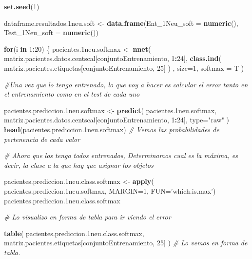 \documentclass[]{article}
\newenvironment{Shaded}{\begin{snugshade}}{\end{snugshade}}
\newcommand{\KeywordTok}[1]{\textcolor[rgb]{0.13,0.29,0.53}{\textbf{#1}}}
\newcommand{\DataTypeTok}[1]{\textcolor[rgb]{0.13,0.29,0.53}{#1}}
\newcommand{\DecValTok}[1]{\textcolor[rgb]{0.00,0.00,0.81}{#1}}
\newcommand{\StringTok}[1]{\textcolor[rgb]{0.31,0.60,0.02}{#1}}
\newcommand{\CommentTok}[1]{\textcolor[rgb]{0.56,0.35,0.01}{\textit{#1}}}
\newcommand{\ControlFlowTok}[1]{\textcolor[rgb]{0.13,0.29,0.53}{\textbf{#1}}}
\newcommand{\OperatorTok}[1]{\textcolor[rgb]{0.81,0.36,0.00}{\textbf{#1}}}
\newcommand{\NormalTok}[1]{#1}
\begin{document}
\begin{Shaded}
\begin{Highlighting}[]
\KeywordTok{set.seed}\NormalTok{(}\DecValTok{1}\NormalTok{)}

\NormalTok{dataframe.resultados.1neu.soft <-}\StringTok{ }\KeywordTok{data.frame}\NormalTok{(}\DataTypeTok{Ent_1Neu_soft =} \KeywordTok{numeric}\NormalTok{(),}
                                             \DataTypeTok{Test_1Neu_soft =} \KeywordTok{numeric}\NormalTok{())}

\ControlFlowTok{for}\NormalTok{(i }\ControlFlowTok{in} \DecValTok{1}\OperatorTok{:}\DecValTok{20}\NormalTok{)}
\NormalTok{\{}
\NormalTok{  pacientes.1neu.softmax <-}\StringTok{ }\KeywordTok{nnet}\NormalTok{( matriz.pacientes.datos.centscal[conjuntoEntrenamiento, }\DecValTok{1}\OperatorTok{:}\DecValTok{24}\NormalTok{], }\KeywordTok{class.ind}\NormalTok{( matriz.pacientes.etiquetas[conjuntoEntrenamiento, }\DecValTok{25}\NormalTok{] ) , }\DataTypeTok{size=}\DecValTok{1}\NormalTok{, }\DataTypeTok{softmax =}\NormalTok{ T )}

  \CommentTok{#Una vez que lo tengo entrenado, lo que voy a hacer es calcular el error tanto en el entrenamiento como en el test de cada uno}
  
\NormalTok{  pacientes.prediccion.1neu.softmax <-}\StringTok{ }\KeywordTok{predict}\NormalTok{( pacientes.1neu.softmax, matriz.pacientes.datos.centscal[conjuntoEntrenamiento, }\DecValTok{1}\OperatorTok{:}\DecValTok{24}\NormalTok{], }\DataTypeTok{type=}\StringTok{"raw"}\NormalTok{ )}
  \KeywordTok{head}\NormalTok{(pacientes.prediccion.1neu.softmax) }\CommentTok{# Vemos las probabilidades de pertenencia de cada valor}
  
  \CommentTok{# Ahora que los tengo todos entrenados, Determinamos cual es la máxima, es decir, la clase a la que hay que asignar los objetos}
  
\NormalTok{  pacientes.prediccion.1neu.class.softmax <-}\StringTok{ }\KeywordTok{apply}\NormalTok{( pacientes.prediccion.1neu.softmax, }\DataTypeTok{MARGIN=}\DecValTok{1}\NormalTok{, }\DataTypeTok{FUN=}\StringTok{'which.is.max'}\NormalTok{)}
\NormalTok{  pacientes.prediccion.1neu.class.softmax}
  
  \CommentTok{# Lo visualizo en forma de tabla para ir viendo el error}
  
  \KeywordTok{table}\NormalTok{( pacientes.prediccion.1neu.class.softmax, matriz.pacientes.etiquetas[conjuntoEntrenamiento, }\DecValTok{25}\NormalTok{] )  }\CommentTok{# Lo vemos en forma de tabla.}
  

\end{Highlighting}
\end{Shaded}
\end{document}
